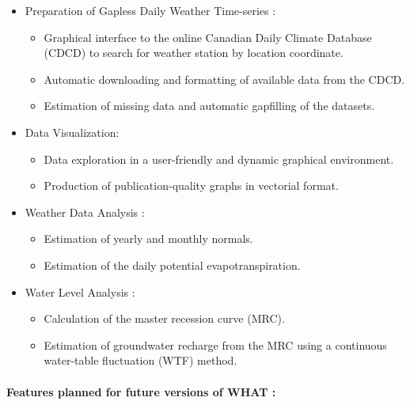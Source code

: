 \documentclass[WHATMANUAL.tex]{subfiles}
\begin{document}
\begin{itemize}

\item Preparation of Gapless Daily Weather Time-series :
   
    \begin{itemize}    
        \item Graphical interface to the online Canadian Daily Climate Database (CDCD) to search for weather station by location coordinate.
        \item Automatic downloading and formatting of available data from the CDCD.
        \item Estimation of missing data and automatic gapfilling of the datasets.
    \end{itemize}
 
\item Data Visualization:

    \begin{itemize}
        \item Data exploration in a user-friendly and dynamic graphical environment.
        \item Production of publication-quality graphs in vectorial format.
    \end{itemize}

\item Weather Data Analysis :

    \begin{itemize}
        \item Estimation of yearly and monthly normals.
        \item Estimation of the daily potential evapotranspiration.
    \end{itemize}

\item Water Level Analysis :

    \begin{itemize}
        \item Calculation of the master recession curve (MRC).
        \item Estimation of groundwater recharge from the MRC using a continuous water-table fluctuation (WTF) method.
    \end{itemize}

\end{itemize}

\paragraph*{Features planned for future versions of WHAT :}
\end{document}

